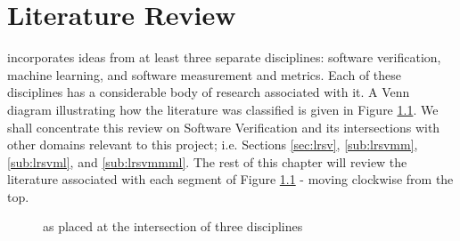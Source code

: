 \chapter{Literature Review}%
\thispagestyle{nohead}
\label{LitReview} %


\where incorporates ideas from at least three separate disciplines: software verification, machine learning, and software measurement and metrics. Each of these disciplines has a considerable body of research associated with it.
A Venn diagram illustrating how the literature was classified is given in Figure \ref{fig:litreview}. 
We shall concentrate this review on Software Verification and its intersections with other domains relevant to this project; i.e. Sections \ref{sec:lrsv}, \ref{sub:lrsvmm}, \ref{sub:lrsvml}, and \ref{sub:lrsvmmml}. 
The rest of this chapter will review the literature associated with each segment of Figure \ref{fig:litreview} - moving clockwise from the top.


\begin{figure}

\centering
\def\firstcircle{(3cm,0cm) circle (2.5cm)}
\def\secondcircle{(0cm,0cm) circle (2.5cm)}
\def\thirdcircle{(1.5cm,3cm) circle (2.5cm)}

\caption{\where as placed at the intersection of three disciplines}
\label{fig:litreview}

\end{figure}


